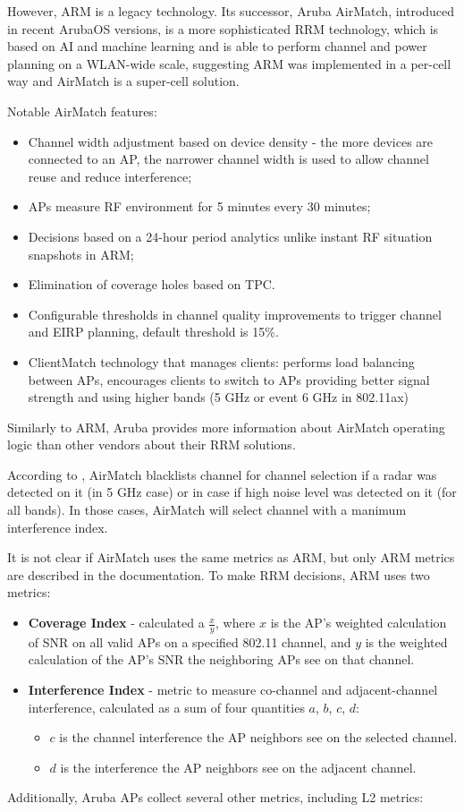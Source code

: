 However, ARM is a legacy technology. Its successor, Aruba AirMatch, introduced in recent ArubaOS versions, is a more sophisticated RRM technology, which is based on AI and machine learning and is able to perform channel and power planning on a WLAN-wide scale, suggesting ARM was implemented in a per-cell way and AirMatch is a super-cell solution.

Notable AirMatch features:

\begin{itemize}
    \item Channel width adjustment based on device density - the more devices are connected to an AP, the narrower channel width is used to allow channel reuse and reduce interference;
    \item APs measure RF environment for 5 minutes every 30 minutes;
    \item Decisions based on a 24-hour period analytics unlike instant RF situation snapshots in ARM;
    \item Elimination of coverage holes based on TPC.
    \item Configurable thresholds in channel quality improvements to trigger channel and EIRP planning, default threshold is 15\%.
    \item ClientMatch technology that manages clients: performs load balancing between APs, encourages clients to switch to APs providing better signal strength and using higher bands (5 GHz or event 6 GHz in 802.11ax)
\end{itemize}

Similarly to ARM, Aruba provides more information about AirMatch operating logic than other vendors about their RRM solutions.

According to \cite{ArubaOSUserGuide}, AirMatch blacklists channel for channel selection if a radar was detected on it (in 5 GHz case) or in case if high noise level was detected on it (for all bands). In those cases, AirMatch will select channel with a manimum interference index.

It is not clear if AirMatch uses the same metrics as ARM, but only ARM metrics are described in the documentation.
To make RRM decisions, ARM uses two metrics:
\begin{itemize}
    \item \textbf{Coverage Index} - calculated a $\frac{x}{y}$, where $x$ is the AP's weighted calculation of SNR on all valid APs on a specified 802.11 channel, and $y$ is the weighted calculation of the AP's SNR the neighboring APs see on that channel.
    \item \textbf{Interference Index} - metric to measure co-channel and adjacent-channel interference, calculated as a sum of four quantities $a$, $b$, $c$, $d$:
    \begin{itemize}
        \item $c$ is the channel interference the AP neighbors see on the selected channel.
        \item $d$ is the interference the AP neighbors see on the adjacent channel.
    \end{itemize}
\end{itemize}
Additionally, Aruba APs collect several other metrics, including L2 metrics:

